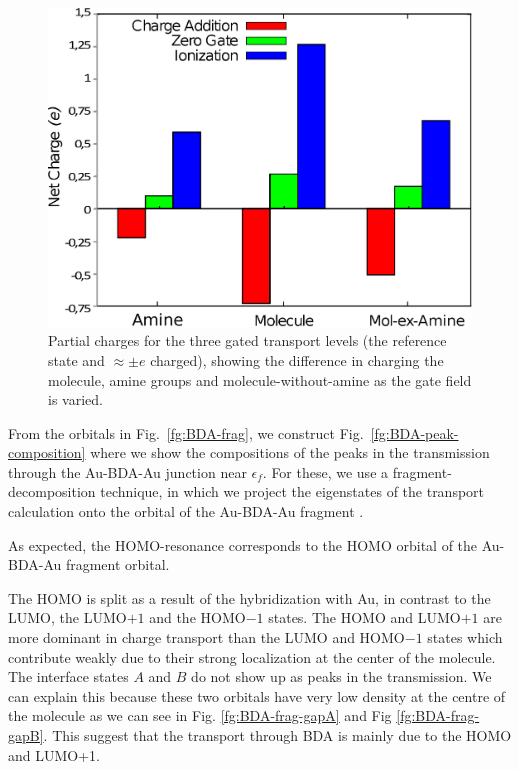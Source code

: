 \documentclass[aip,jcp,a4paper,reprint,floatfix,superscriptaddress]{revtex4-1}
\begin{document}
\begin{figure}
\includegraphics[width=.8\columnwidth]{gating-BDA-GGA-N}
\caption{Partial charges for the three gated transport levels (the reference state and $\approx\pm e$ charged), showing the difference in charging the molecule, amine groups and molecule-without-amine as the gate field is varied.} \label{fg:gated_charges_BDA}
\end{figure}

From the orbitals in Fig.~\ref{fg:BDA-frag},  we construct Fig.~\ref{fg:BDA-peak-composition} where we show the compositions of the peaks in the transmission through the Au-BDA-Au junction near $\epsilon_{f}$. For these, we use a fragment-decomposition technique, in which we project the eigenstates of the transport calculation onto the orbital of the Au-BDA-Au fragment \cite{Verzijl2012}. 

As expected, the HOMO-resonance corresponds to the HOMO orbital of the  Au-BDA-Au fragment orbital.

The HOMO is split as a result of the hybridization with Au, in contrast to the LUMO, the LUMO$+1$ and the HOMO$-1$ states. The HOMO and LUMO$+1$ are more dominant in charge transport than the LUMO and HOMO$-1$ states which contribute weakly due to their strong localization at the center of the molecule. The interface states ${A}$ and ${B}$ do not show up as peaks in the transmission. We can explain this because these two orbitals have very low density at the centre of the molecule as we can see in Fig. \ref{fg:BDA-frag-gapA} and Fig \ref{fg:BDA-frag-gapB}. This suggest that the transport through BDA is mainly due to the HOMO and LUMO+1. 
\end{document}
